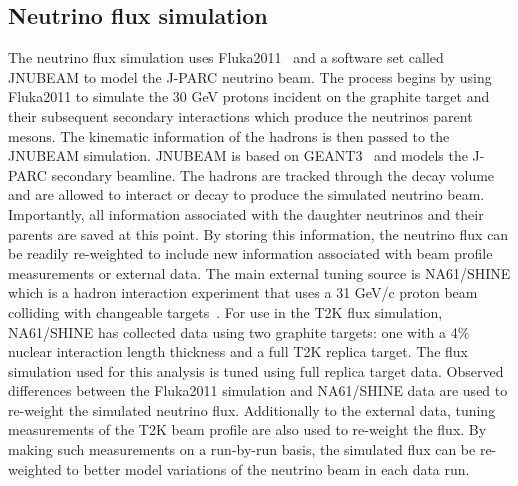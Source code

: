 \subsection{Neutrino flux simulation}
\label{subsec:NeutrinoFluxSimulation}
The neutrino flux simulation uses Fluka2011~\cite{Ferrari_fluka:a} and a software set called JNUBEAM to model the J-PARC neutrino beam.  The process begins by using Fluka2011 to simulate the 30 GeV protons incident on the graphite target and their subsequent secondary interactions which produce the neutrinos parent mesons.  The kinematic information of the hadrons is then passed to the JNUBEAM simulation.  JNUBEAM is based on GEANT3~\cite{Brun:1987ma} and models the J-PARC secondary beamline.  The hadrons are tracked through the decay volume and are allowed to interact or decay to produce the simulated neutrino beam.  Importantly, all information associated with the daughter neutrinos and their parents are saved at this point.  By storing this information, the neutrino flux can be readily re-weighted to include new information associated with beam profile measurements or external data.
\newline
\newline
The main external tuning source is NA61/SHINE which is a hadron interaction experiment that uses a 31 GeV/c proton beam colliding with changeable targets~\cite{PhysRevC.84.034604}.  For use in the T2K flux simulation, NA61/SHINE has collected data using two graphite targets: one with a 4$\%$ nuclear interaction length thickness and a full T2K replica target.  The flux simulation used for this analysis is tuned using full replica target data.  Observed differences between the Fluka2011 simulation and NA61/SHINE data are used to re-weight the simulated neutrino flux.
\newline
\newline
Additionally to the external data, tuning measurements of the T2K beam profile are also used to re-weight the flux.  By making such measurements on a run-by-run basis, the simulated flux can be re-weighted to better model variations of the neutrino beam in each data run.
